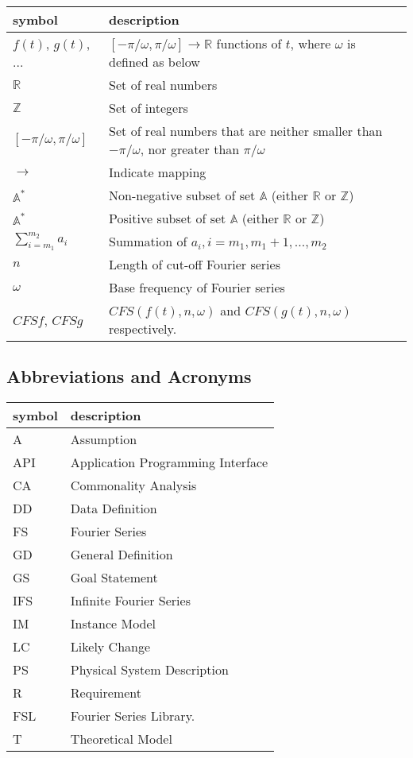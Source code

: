 \documentclass[12pt]{article}
\newcommand{\famname}{FSL} %
\begin{document}
\renewcommand{\arraystretch}{1.2}
\noindent \begin{longtable*}{l l p{12cm}} \toprule
\textbf{symbol} & \textbf{description}\\
\midrule 
$f(t)$, $g(t)$, ... & $[-\pi/\omega, \pi/\omega]\rightarrow\mathbb{R}$ functions of $t$, where $\omega$ is defined as below\\
$\mathbb{R}$ & Set of real numbers\\
$\mathbb{Z}$ & Set of integers\\
$[-\pi/\omega, \pi/\omega]$ & Set of real numbers that are neither smaller than $-\pi/\omega$, nor greater than $\pi/\omega$ \\
$\rightarrow$ & Indicate mapping\\
$\mathbb{A}^{*}$ & Non-negative subset of set $\mathbb{A}$ (either $\mathbb{R}$ or $\mathbb{Z}$)\\
$\mathbb{A}^{*}$ & Positive subset of set $\mathbb{A}$ (either $\mathbb{R}$ or $\mathbb{Z}$)\\
$\sum_{i=m_1}^{m_2}a_i$ & Summation of $a_i, i=m_1, m_1+1, ..., m_2$\\
$n$ & Length of cut-off Fourier series\\ 
$\omega$ & Base frequency of Fourier series \\
$\mathit{CFSf}$, $\mathit{CFSg}$ & $\mathit{CFS}(f(t), n, \omega)$ and $\mathit{CFS}(g(t), n, \omega)$ respectively.\\
\bottomrule
\end{longtable*}

\subsection{Abbreviations and Acronyms}

\renewcommand{\arraystretch}{1.2}
\begin{tabular}{l l} 
  \toprule		
  \textbf{symbol} & \textbf{description}\\
  \midrule 
  A & Assumption\\
  API & Application Programming Interface\\
  CA & Commonality Analysis\\
  DD & Data Definition\\
  FS & Fourier Series\\
  GD & General Definition\\
  GS & Goal Statement\\
  IFS & Infinite Fourier Series\\
  IM & Instance Model\\
  LC & Likely Change\\
  PS & Physical System Description\\
  R & Requirement\\
  \famname{} & Fourier Series Library.\\
  T & Theoretical Model\\
  \bottomrule
\end{tabular}\\
\end{document}
